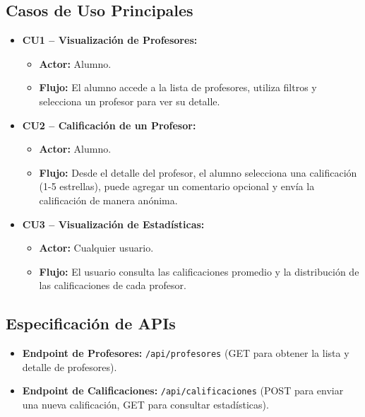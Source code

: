 \documentclass[11pt]{article}
\begin{document}
\subsection{Casos de Uso Principales}
\begin{itemize}
    \item \textbf{CU1 – Visualización de Profesores:}
    \begin{itemize}
        \item \textbf{Actor:} Alumno.
        \item \textbf{Flujo:} El alumno accede a la lista de profesores, utiliza filtros y selecciona un profesor para ver su detalle.
    \end{itemize}
    \item \textbf{CU2 – Calificación de un Profesor:}
    \begin{itemize}
        \item \textbf{Actor:} Alumno.
        \item \textbf{Flujo:} Desde el detalle del profesor, el alumno selecciona una calificación (1-5 estrellas), puede agregar un comentario opcional y envía la calificación de manera anónima.
    \end{itemize}
    \item \textbf{CU3 – Visualización de Estadísticas:}
    \begin{itemize}
        \item \textbf{Actor:} Cualquier usuario.
        \item \textbf{Flujo:} El usuario consulta las calificaciones promedio y la distribución de las calificaciones de cada profesor.
    \end{itemize}
\end{itemize}

\subsection{Especificación de APIs}
\begin{itemize}
    \item \textbf{Endpoint de Profesores:} \texttt{/api/profesores} (GET para obtener la lista y detalle de profesores).
    \item \textbf{Endpoint de Calificaciones:} \texttt{/api/calificaciones} (POST para enviar una nueva calificación, GET para consultar estadísticas).
\end{itemize}
\end{document}
